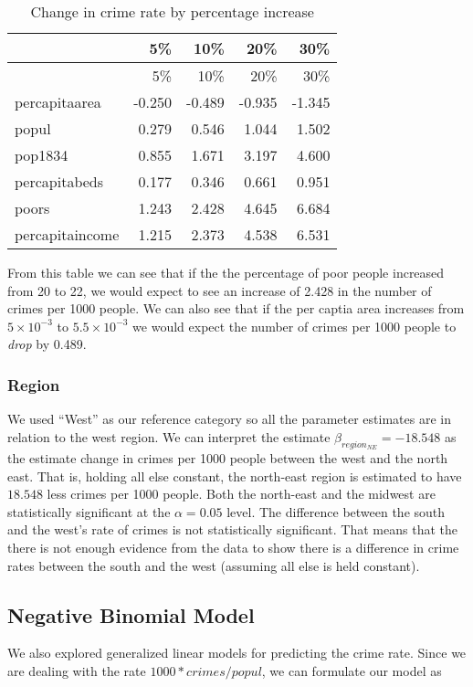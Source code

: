 \documentclass[]{article}
\begin{document}
\begin{longtable}[]{@{}lrrrr@{}}
\caption{Change in crime rate by percentage increase}\tabularnewline
\toprule
& 5\% & 10\% & 20\% & 30\%\tabularnewline
\midrule
\endfirsthead
\toprule
& 5\% & 10\% & 20\% & 30\%\tabularnewline
\midrule
\endhead
percapitaarea & -0.250 & -0.489 & -0.935 & -1.345\tabularnewline
popul & 0.279 & 0.546 & 1.044 & 1.502\tabularnewline
pop1834 & 0.855 & 1.671 & 3.197 & 4.600\tabularnewline
percapitabeds & 0.177 & 0.346 & 0.661 & 0.951\tabularnewline
poors & 1.243 & 2.428 & 4.645 & 6.684\tabularnewline
percapitaincome & 1.215 & 2.373 & 4.538 & 6.531\tabularnewline
\bottomrule
\end{longtable}

From this table we can see that if the the percentage of poor people
increased from 20 to 22, we would expect to see an increase of 2.428 in
the number of crimes per 1000 people. We can also see that if the per
captia area increases from \(5 \times 10^{-3}\) to
\(5.5 \times 10^{-3}\) we would expect the number of crimes per 1000
people to \emph{drop} by 0.489.

\subsubsection{Region}\label{region}

We used ``West'' as our reference category so all the parameter
estimates are in relation to the west region. We can interpret the
estimate \(\beta_{region_{NE}} = -18.548\) as the estimate change in
crimes per 1000 people between the west and the north east. That is,
holding all else constant, the north-east region is estimated to have
\(18.548\) less crimes per 1000 people. Both the north-east and the
midwest are statistically significant at the \(\alpha = 0.05\) level.
The difference between the south and the west's rate of crimes is not
statistically significant. That means that the there is not enough
evidence from the data to show there is a difference in crime rates
between the south and the west (assuming all else is held constant).

\subsection{Negative Binomial Model}\label{negative-binomial-model}

We also explored generalized linear models for predicting the crime
rate. Since we are dealing with the rate \(1000 * crimes/popul\), we can
formulate our model as
\end{document}
